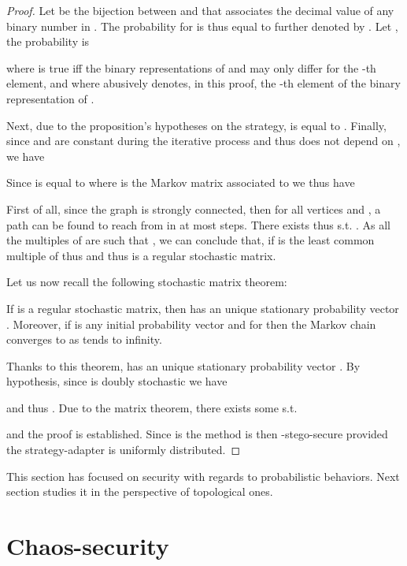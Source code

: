 \documentclass{comjnl}
\begin{document}
\begin{proof}   
Let  be the bijection between  and 
 that associates the decimal value
of any  binary number in .
The probability  for  is thus equal to 
 further denoted by .
Let , 
the probability   is 

\noindent 
where  is true iff the binary representations of 
 and  may only differ for the  -th element,
and where 
 abusively denotes, in this proof, the -th element of the binary representation of 
.

Next, due to the proposition's hypotheses on the strategy,
 is equal to  
.
Finally, since  and  are constant during the 
iterative process  and thus does not depend on , we have 


Since 
 is equal to  where   is the Markov matrix associated to
  we thus have



First of all, 
since the graph  is strongly connected,
then for all vertices  and , a path can
be  found to  reach   from   in at  most   steps.  
There  exists thus  s.t.
.  
As all the multiples  of  are such that 
, 
we can  conclude that, if
 is the least common multiple of  thus 
 and thus 
 is a regular stochastic matrix.


Let us now recall the following stochastic matrix theorem:
\begin{theorem}
  If  is a regular stochastic matrix, then  
  has an unique stationary  probability vector . Moreover, 
  if  is any initial probability vector and 
   for  then the Markov chain 
  converges to  as  tends to infinity.
\end{theorem}

Thanks to this theorem,  
has an unique stationary  probability vector . 
By hypothesis, since  is doubly stochastic we have 

and thus .
Due to the matrix theorem, there exists some 
 s.t. 

and the proof is established.
Since  is  the method is then -stego-secure
provided the strategy-adapter is uniformly distributed.
 \end{proof}

This section has focused on security with regards to probabilistic behaviors. 
Next section studies it in the perspective of topological ones.




\section{Chaos-security}\label{sec:chaossecurity}
\end{document}
